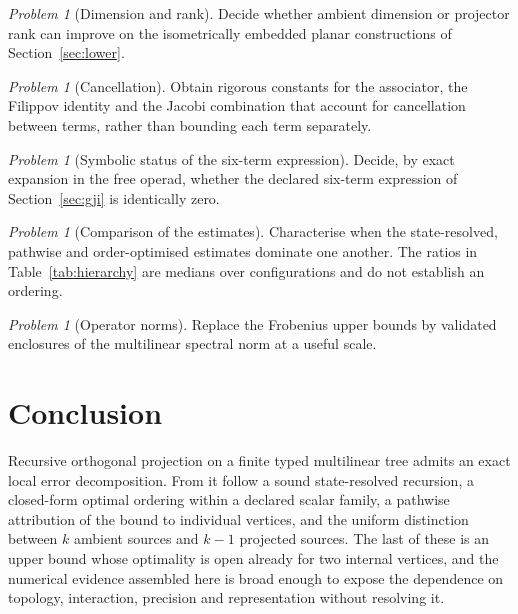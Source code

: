\documentclass[11pt]{amsart}
\theoremstyle{definition}
\theoremstyle{remark}
\newtheorem{problem}[theorem]{Problem}
\begin{document}
\begin{problem}[Dimension and rank]
\label{prob:dimension}
Decide whether ambient dimension or projector rank can improve on the isometrically
embedded planar constructions of Section~\ref{sec:lower}.
\end{problem}

\begin{problem}[Cancellation]
\label{prob:cancellation}
Obtain rigorous constants for the associator, the Filippov identity and the Jacobi
combination that account for cancellation between terms, rather than bounding each term
separately.
\end{problem}

\begin{problem}[Symbolic status of the six-term expression]
\label{prob:gji}
Decide, by exact expansion in the free operad, whether the declared six-term expression of
Section~\ref{sec:gji} is identically zero.
\end{problem}

\begin{problem}[Comparison of the estimates]
\label{prob:domination}
Characterise when the state-resolved, pathwise and order-optimised estimates dominate one
another. The ratios in Table~\ref{tab:hierarchy} are medians over configurations and do
not establish an ordering.
\end{problem}

\begin{problem}[Operator norms]
\label{prob:norms}
Replace the Frobenius upper bounds by validated enclosures of the multilinear spectral
norm at a useful scale.
\end{problem}

\section{Conclusion}
\label{sec:conclusion}

Recursive orthogonal projection on a finite typed multilinear tree admits an exact local
error decomposition. From it follow a sound state-resolved recursion, a closed-form
optimal ordering within a declared scalar family, a pathwise attribution of the bound to
individual vertices, and the uniform distinction between $k$ ambient sources and $k-1$
projected sources. The last of these is an upper bound whose optimality is open already
for two internal vertices, and the numerical evidence assembled here is broad enough to
expose the dependence on topology, interaction, precision and representation without
resolving it.
\end{document}

